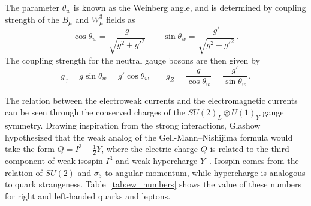 The parameter $\theta_w$ is known as the Weinberg angle, and is determined by coupling strength of the $B_\mu$ and $W_\mu^3$ fields as
\begin{equation}
	\cos\theta_w=\frac{g}{\sqrt{g^2+g'^2}} \qquad \sin\theta_w=\frac{g'}{\sqrt{g^2+g'^2}}\,.
\end{equation}
The coupling strength for the neutral gauge bosons are then given by
\begin{equation}
	g_\gamma=g\sin\theta_w=g'\cos\theta_w \qquad g_Z=\frac{g}{\cos\theta_w}=\frac{g'}{\sin\theta_w}\,.
\end{equation}

The relation between the electroweak currents and the electromagnetic currents can be seen through the conserved charges of the $SU(2)_L\otimes U(1)_Y$ gauge symmetry. Drawing inspiration from the strong interactions, Glashow hypothesized that the weak analog of the Gell-Mann--Nishijima formula would take the form $Q=I^3+\frac{1}{2}Y$, where the electric charge $Q$ is related to the third component of weak isospin $I^3$ and weak hypercharge $Y$~\cite{weakisospin}. Isospin comes from the relation of $SU(2)$ and $\sigma_3$ to angular momentum, while hypercharge is analogous to quark strangeness. Table~\ref{tab:ew_numbers} shows the value of these numbers for right and left-handed quarks and leptons.

